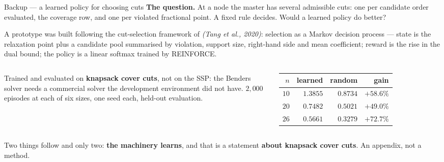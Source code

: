 \documentclass[aspectratio=169,10pt]{beamer}
\newcommand{\cit}[1]{{\itshape\color{muted}(#1)}}
\begin{document}
\begin{frame}{Backup --- a learned policy for choosing cuts}
\vspace{0.02cm}
{\small\textbf{The question.} At a node the master has several
admissible cuts: one per candidate order evaluated, the coverage row, and one per
violated fractional point. A fixed rule decides. Would a learned policy do better?}

\vspace{0.14cm}
{\small A prototype was built following the cut-selection framework of
\cit{Tang et al., 2020}: selection as a Markov decision process --- state is the
relaxation point plus a candidate pool summarised by violation, support size, right-hand
side and mean coefficient; reward is the rise in the dual bound; the policy is a linear
softmax trained by REINFORCE.}

\vspace{0.2cm}
\begin{columns}[T,onlytextwidth]
{\footnotesize Trained and evaluated on \textbf{knapsack cover cuts}, not on the SSP:
the Benders solver needs a commercial solver the development environment did not have.
$2{,}000$ episodes at each of six sizes, one seed each, held-out evaluation.}

\centering\scriptsize
\begin{tabular}{@{}rrrr@{}}
\toprule
$n$ & learned & random & gain\\
\midrule
$10$ & $1.3855$ & $0.8734$ & $+58.6\%$\\
$20$ & $0.7482$ & $0.5021$ & $+49.0\%$\\
$26$ & $0.5661$ & $0.3279$ & $+72.7\%$\\
\bottomrule
\end{tabular}
\end{columns}

\vspace{0.14cm}
\centering
{\small Two things follow and only two: \textbf{the machinery learns}, and that is a
statement \textbf{about knapsack cover cuts}. An appendix, not a method.}
\end{frame}
\end{document}
